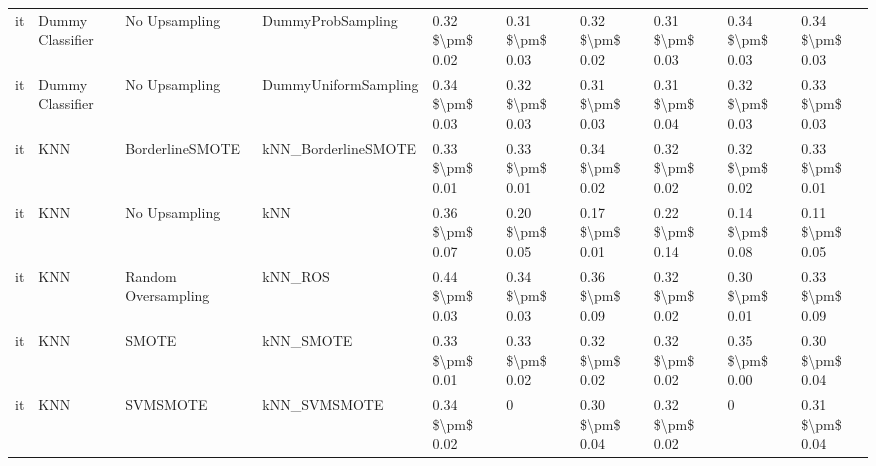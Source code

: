 \begin{tabular}{llllllllll}
      it &                Dummy Classifier &                 No Upsampling &                            DummyProbSampling & 0.32 \$\textbackslash pm\$ 0.02 &           0.31 \$\textbackslash pm\$ 0.03 &       0.32 \$\textbackslash pm\$ 0.02 &        0.31 \$\textbackslash pm\$ 0.03 &                         0.34 \$\textbackslash pm\$ 0.03 &     0.34 \$\textbackslash pm\$ 0.03 \\
      it &                Dummy Classifier &                 No Upsampling &                         DummyUniformSampling & 0.34 \$\textbackslash pm\$ 0.03 &           0.32 \$\textbackslash pm\$ 0.03 &       0.31 \$\textbackslash pm\$ 0.03 &        0.31 \$\textbackslash pm\$ 0.04 &                         0.32 \$\textbackslash pm\$ 0.03 &     0.33 \$\textbackslash pm\$ 0.03 \\
      it &                             KNN &               BorderlineSMOTE &                          kNN\_BorderlineSMOTE & 0.33 \$\textbackslash pm\$ 0.01 &           0.33 \$\textbackslash pm\$ 0.01 &       0.34 \$\textbackslash pm\$ 0.02 &        0.32 \$\textbackslash pm\$ 0.02 &                         0.32 \$\textbackslash pm\$ 0.02 &     0.33 \$\textbackslash pm\$ 0.01 \\
      it &                             KNN &                 No Upsampling &                                          kNN & 0.36 \$\textbackslash pm\$ 0.07 &           0.20 \$\textbackslash pm\$ 0.05 &       0.17 \$\textbackslash pm\$ 0.01 &        0.22 \$\textbackslash pm\$ 0.14 &                         0.14 \$\textbackslash pm\$ 0.08 &     0.11 \$\textbackslash pm\$ 0.05 \\
      it &                             KNN &           Random Oversampling &                                      kNN\_ROS & 0.44 \$\textbackslash pm\$ 0.03 &           0.34 \$\textbackslash pm\$ 0.03 &       0.36 \$\textbackslash pm\$ 0.09 &        0.32 \$\textbackslash pm\$ 0.02 &                         0.30 \$\textbackslash pm\$ 0.01 &     0.33 \$\textbackslash pm\$ 0.09 \\
      it &                             KNN &                         SMOTE &                                    kNN\_SMOTE & 0.33 \$\textbackslash pm\$ 0.01 &           0.33 \$\textbackslash pm\$ 0.02 &       0.32 \$\textbackslash pm\$ 0.02 &        0.32 \$\textbackslash pm\$ 0.02 &                         0.35 \$\textbackslash pm\$ 0.00 &     0.30 \$\textbackslash pm\$ 0.04 \\
      it &                             KNN &                      SVMSMOTE &                                 kNN\_SVMSMOTE & 0.34 \$\textbackslash pm\$ 0.02 &                         0 &       0.30 \$\textbackslash pm\$ 0.04 &        0.32 \$\textbackslash pm\$ 0.02 &                                       0 &     0.31 \$\textbackslash pm\$ 0.04 \\

\end{tabular}
